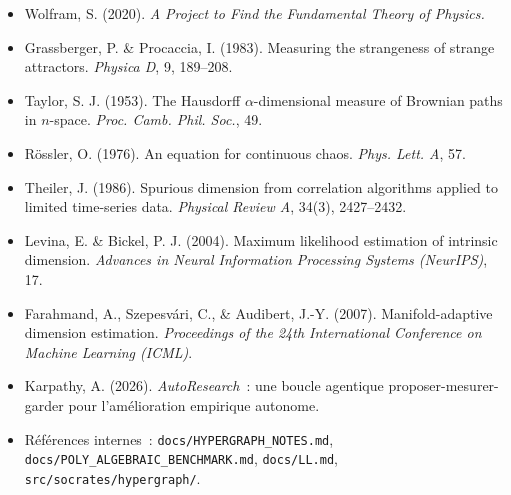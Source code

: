 \documentclass[11pt,a4paper]{article}
\begin{document}
\begin{itemize}
\item[] Wolfram, S. (2020). \emph{A Project to Find the Fundamental Theory of Physics.}
\item[] Grassberger, P. \& Procaccia, I. (1983). Measuring the strangeness of
  strange attractors. \emph{Physica D}, 9, 189--208.
\item[] Taylor, S. J. (1953). The Hausdorff $\alpha$-dimensional measure of
  Brownian paths in $n$-space. \emph{Proc. Camb. Phil. Soc.}, 49.
\item[] R\"ossler, O. (1976). An equation for continuous chaos.
  \emph{Phys. Lett. A}, 57.
\item[] Theiler, J. (1986). Spurious dimension from correlation algorithms
  applied to limited time-series data. \emph{Physical Review A}, 34(3),
  2427--2432.
\item[] Levina, E. \& Bickel, P. J. (2004). Maximum likelihood estimation
  of intrinsic dimension. \emph{Advances in Neural Information Processing
  Systems (NeurIPS)}, 17.
\item[] Farahmand, A., Szepesv\'ari, C., \& Audibert, J.-Y. (2007).
  Manifold-adaptive dimension estimation. \emph{Proceedings of the 24th
  International Conference on Machine Learning (ICML)}.
\item[] Karpathy, A. (2026). \emph{AutoResearch}~: une boucle agentique
  proposer-mesurer-garder pour l'amélioration empirique autonome.
\item[] Références internes~: \texttt{docs/HYPERGRAPH\_NOTES.md},
  \texttt{docs/POLY\_ALGEBRAIC\_BENCHMARK.md}, \texttt{docs/LL.md},
  \texttt{src/socrates/hypergraph/}.
\end{itemize}
\end{document}
